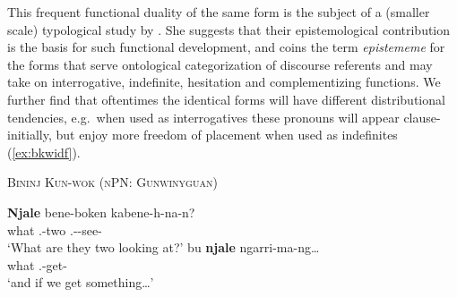 \documentclass[12pt,egregdoesnotlikesansseriftitles]{scrartcl}
\begin{document}
This frequent functional duality of the same form is the subject of a (smaller scale) typological study by \citet{mushin95}. She suggests that their epistemological contribution is the basis for such functional development, and coins the term \textit{epistememe} for the forms that serve ontological categorization of discourse referents and may take on interrogative, indefinite, hesitation and complementizing functions. We further find that oftentimes the identical forms will have different distributional tendencies, e.g.\ when used as interrogatives these pronouns will appear clause-initially, but enjoy more freedom of placement when used as indefinites (\ref{ex:bkwidf}).
\begin{exe}
  \ex\label{ex:bkwidf} \textsc{Bininj Kun-wok (nPN: Gunwinyguan)}\hfill {}
  \begin{xlist}
    \ex\gll \textbf{Njale} bene-boken kabene-h-na-n?\\
    what \Third.\Ua-two \Third.\Ua-\Imm-see-\Np\\
    `What are they two looking at?' %
    \ex\gll bu \textbf{njale} ngarri-ma-ng\ldots\\
    \Sub{} what \First.\Aug-get-\Np\\
    `and if we get something\ldots' %
  \end{xlist}
\end{exe}
\end{document}
